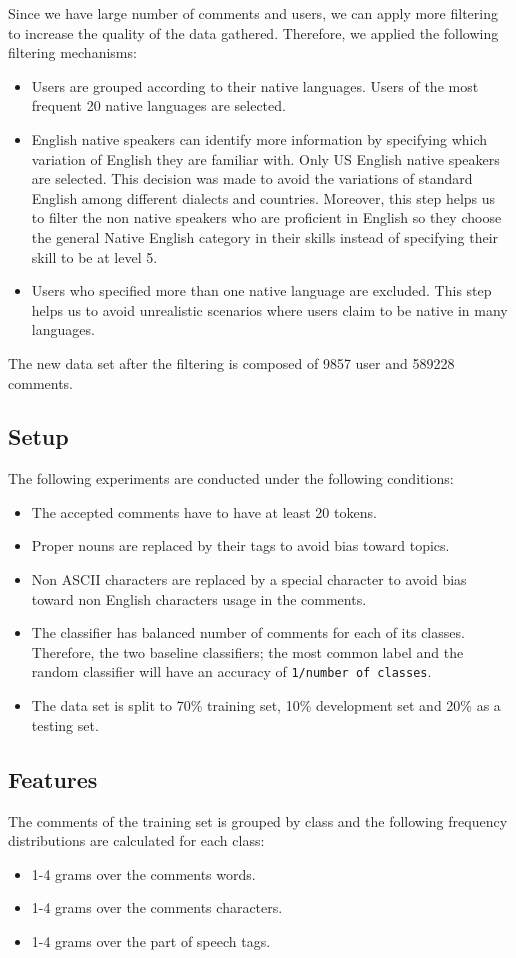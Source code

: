 \documentclass[11pt]{article}
\begin{document}
Since we have large number of comments and users, we can apply more filtering to
increase the quality of the data gathered. Therefore, we applied the following filtering mechanisms:
\begin{itemize}
\item Users are grouped according to their native languages. Users of the most frequent 20 native languages are selected.
\item English native speakers can identify more information by specifying which
variation of English they are familiar with. Only US English native speakers are
selected. This decision was made to avoid the variations of standard English
among different dialects and countries. Moreover, this step helps us to filter
the non native speakers who are proficient in English so they choose the general
Native English category in their skills instead of specifying their skill to be
at level 5.
\item Users who specified more than one native language are excluded. This step
helps us to avoid unrealistic scenarios where users claim to be native in many
languages.
\end{itemize}

The new data set after the filtering is composed of 9857 user and 589228 comments.

\subsection{Setup}
The following experiments are conducted under the following conditions:
\begin{itemize}
\item The accepted comments have to have at least 20 tokens.
\item Proper nouns are replaced by their tags to avoid bias toward topics.
\item Non ASCII characters are replaced by a special character to avoid bias toward non English characters usage in the comments.
\item The classifier has balanced number of comments for each of its classes. Therefore, the two baseline classifiers; the most common label and the random classifier will have an accuracy of \verb+1/number of classes+.
\item The data set is split to 70\% training set, 10\% development set and 20\%
as a testing set.
\end{itemize}

\subsection{Features}
The comments of the training set is grouped by class and the following frequency distributions are calculated for each class:
\begin{itemize}
\item 1-4 grams over the comments words.
\item 1-4 grams over the comments characters.
\item 1-4 grams over the part of speech tags.
\end{itemize}
\end{document}
